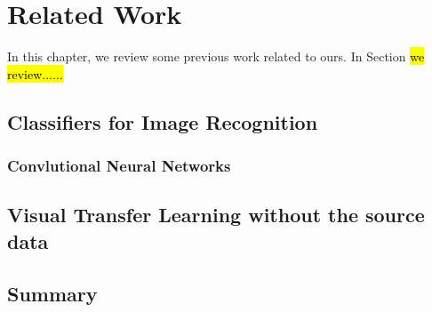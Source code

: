 \chapter{Related Work}
In this chapter, we review some previous work related to ours. In Section \hl{we review......}
\section{Classifiers for Image Recognition}\label{sec:relat:linear}

\subsection{Convlutional Neural Networks}

\section{Visual Transfer Learning without the source data}

\section{Summary}